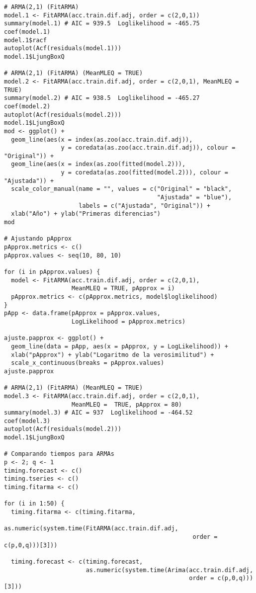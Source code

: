 \documentclass[12pt,a4paper,oneside]{article}
\begin{document}
\begin{Verbatim}[fontsize=\footnotesize]
# ARMA(2,1) (FitARMA)
model.1 <- FitARMA(acc.train.dif.adj, order = c(2,0,1))
summary(model.1) # AIC = 939.5  Loglikelihood = -465.75
coef(model.1)
model.1$racf
autoplot(Acf(residuals(model.1)))
model.1$LjungBoxQ

# ARMA(2,1) (FitARMA) (MeanMLEQ = TRUE)
model.2 <- FitARMA(acc.train.dif.adj, order = c(2,0,1), MeanMLEQ =  TRUE)
summary(model.2) # AIC = 938.5  Loglikelihood = -465.27
coef(model.2)
autoplot(Acf(residuals(model.2)))
model.1$LjungBoxQ
mod <- ggplot() +
  geom_line(aes(x = index(as.zoo(acc.train.dif.adj)),
                y = coredata(as.zoo(acc.train.dif.adj)), colour = "Original")) +
  geom_line(aes(x = index(as.zoo(fitted(model.2))),
                y = coredata(as.zoo(fitted(model.2))), colour = "Ajustada")) +
  scale_color_manual(name = "", values = c("Original" = "black",
                                           "Ajustada" = "blue"),
                     labels = c("Ajustada", "Original")) +
  xlab("Año") + ylab("Primeras diferencias")
mod

# Ajustando pApprox
pApprox.metrics <- c()
pApprox.values <- seq(10, 80, 10)

for (i in pApprox.values) {
  model <- FitARMA(acc.train.dif.adj, order = c(2,0,1),
                   MeanMLEQ = TRUE, pApprox = i)
  pApprox.metrics <- c(pApprox.metrics, model$loglikelihood)
}
pApp <- data.frame(pApprox = pApprox.values,
                   LogLikelihood = pApprox.metrics)

ajuste.papprox <- ggplot() +
  geom_line(data = pApp, aes(x = pApprox, y = LogLikelihood)) +
  xlab("pApprox") + ylab("Logaritmo de la verosimilitud") +
  scale_x_continuous(breaks = pApprox.values)
ajuste.papprox

# ARMA(2,1) (FitARMA) (MeanMLEQ = TRUE)
model.3 <- FitARMA(acc.train.dif.adj, order = c(2,0,1),
                   MeanMLEQ =  TRUE, pApprox = 80)
summary(model.3) # AIC = 937  Loglikelihood = -464.52
coef(model.3)
autoplot(Acf(residuals(model.2)))
model.1$LjungBoxQ

# Comparando tiempos para ARMAs
p <- 2; q <- 1
timing.forecast <- c()
timing.tseries <- c()
timing.fitarma <- c()

for (i in 1:50) {
  timing.fitarma <- c(timing.fitarma,
                      as.numeric(system.time(FitARMA(acc.train.dif.adj,
                                                     order = c(p,0,q)))[3]))

  timing.forecast <- c(timing.forecast,
                       as.numeric(system.time(Arima(acc.train.dif.adj,
                                                    order = c(p,0,q)))[3]))


\end{Verbatim}
\end{document}
